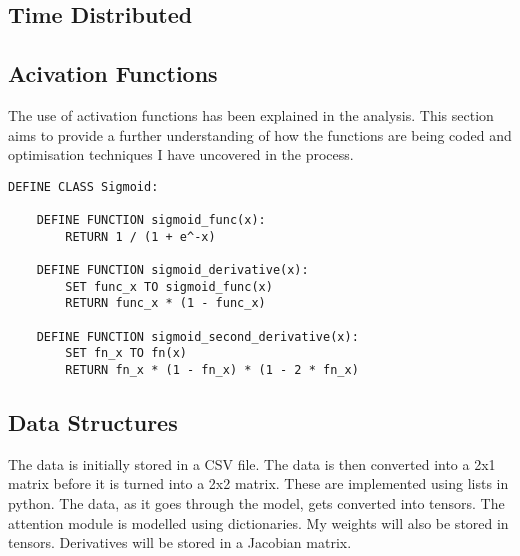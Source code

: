 \documentclass{article}
\begin{document}
\subsection{Time Distributed}





\subsection{Acivation Functions}
The use of activation functions has been explained in the analysis. This section
aims to provide a further understanding of how the functions are being coded and
optimisation techniques I have uncovered in the process.
\begin{lstlisting}
DEFINE CLASS Sigmoid:

    DEFINE FUNCTION sigmoid_func(x):
        RETURN 1 / (1 + e^-x)

    DEFINE FUNCTION sigmoid_derivative(x):
        SET func_x TO sigmoid_func(x)
        RETURN func_x * (1 - func_x)

    DEFINE FUNCTION sigmoid_second_derivative(x):
        SET fn_x TO fn(x)
        RETURN fn_x * (1 - fn_x) * (1 - 2 * fn_x)
\end{lstlisting}





\subsection{Data Structures}
The data is initially stored in a CSV file. The data is then converted into a 2x1 matrix before it is turned into a 2x2 matrix. These are implemented using lists in python. The data, as it goes through the model, gets converted into tensors.
The attention module is modelled using dictionaries.
My weights will also be stored in tensors.
Derivatives will be stored in a Jacobian matrix.
\clearpage
\end{document}
